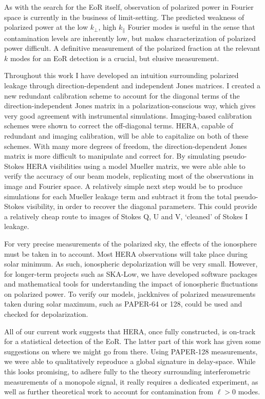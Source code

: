 As with the search for the EoR itself, observation of polarized power in Fourier space is currently in the business of limit-setting. The predicted weakness of polarized power at the low $k_{\perp}$, high $k_{\parallel}$ Fourier modes is useful in the sense that contamination levels are inherently low, but makes characterization of polarized power difficult. A definitive measurement of the polarized fraction at the relevant $k$ modes for an EoR detection is a crucial, but elusive measurement.

Throughout this work I have developed an intuition surrounding polarized leakage through direction-dependent and independent Jones matrices. I created a new redundant calibration scheme to account for the diagonal terms of the direction-independent Jones matrix in a polarization-conscious way, which gives very good agreement with instrumental simulations. Imaging-based calibration schemes were shown to correct the off-diagonal terms. HERA, capable of redundant and imaging calibration, will be able to capitalize on both of these schemes. With many more degrees of freedom, the direction-dependent Jones matrix is more difficult to manipulate and correct for. By simulating pseudo-Stokes HERA visibilities using a model Mueller matrix, we were able able to verify the accuracy of our beam models, replicating most of the observations in image and Fourier space. A relatively simple next step would be to produce simulations for each Mueller leakage term and subtract it from the total pseudo-Stokes visibility, in order to recover the diagonal parameters. This could provide a relatively cheap route to images of Stokes Q, U and V, `cleaned' of Stokes I leakage.

For very precise measurements of the polarized sky, the effects of the ionosphere must be taken in to account. Most HERA observations will take place during solar minimum. As such, ionospheric depolarization will be very small. However, for longer-term projects such as SKA-Low, we have developed software packages and mathematical tools for understanding the impact of ionospheric fluctuations on polarized power. To verify our models, jackknives of polarized measurements taken during solar maximum, such as PAPER-64 or 128, could be used and checked for depolarization.

All of our current work suggests that HERA, once fully constructed, is on-track for a statistical detection of the EoR. The latter part of this work has given some suggestions on where we might go from there. Using PAPER-128 measurements, we were able to qualitatively reproduce a global signature in delay-space. While this looks promising, to adhere fully to the theory surrounding interferometric measurements of a monopole signal, it really requires a dedicated experiment, as well as further theoretical work to account for contamination from $\ell > 0$ modes.


